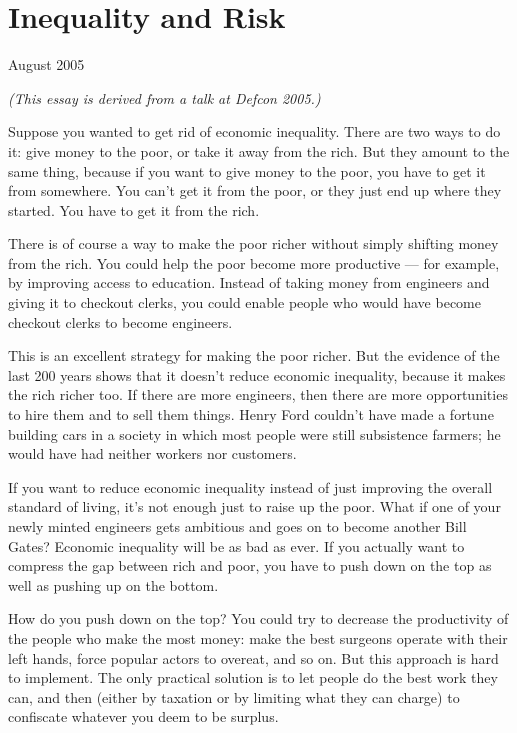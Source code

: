 \chapter{Inequality and Risk}

August 2005

\emph{(This essay is derived from a talk at Defcon 2005.)}

Suppose you wanted to get rid of economic inequality. There are two ways
to do it: give money to the poor, or take it away from the rich. But
they amount to the same thing, because if you want to give money to the
poor, you have to get it from somewhere. You can't get it from the poor,
or they just end up where they started. You have to get it from the
rich.

There is of course a way to make the poor richer without simply shifting
money from the rich. You could help the poor become more productive ---
for example, by improving access to education. Instead of taking money
from engineers and giving it to checkout clerks, you could enable people
who would have become checkout clerks to become engineers.

This is an excellent strategy for making the poor richer. But the
evidence of the last 200 years shows that it doesn't reduce economic
inequality, because it makes the rich richer too. If there are more
engineers, then there are more opportunities to hire them and to sell
them things. Henry Ford couldn't have made a fortune building cars in a
society in which most people were still subsistence farmers; he would
have had neither workers nor customers.

If you want to reduce economic inequality instead of just improving the
overall standard of living, it's not enough just to raise up the poor.
What if one of your newly minted engineers gets ambitious and goes on to
become another Bill Gates? Economic inequality will be as bad as ever.
If you actually want to compress the gap between rich and poor, you have
to push down on the top as well as pushing up on the bottom.

How do you push down on the top? You could try to decrease the
productivity of the people who make the most money: make the best
surgeons operate with their left hands, force popular actors to overeat,
and so on. But this approach is hard to implement. The only practical
solution is to let people do the best work they can, and then (either by
taxation or by limiting what they can charge) to confiscate whatever you
deem to be surplus.

